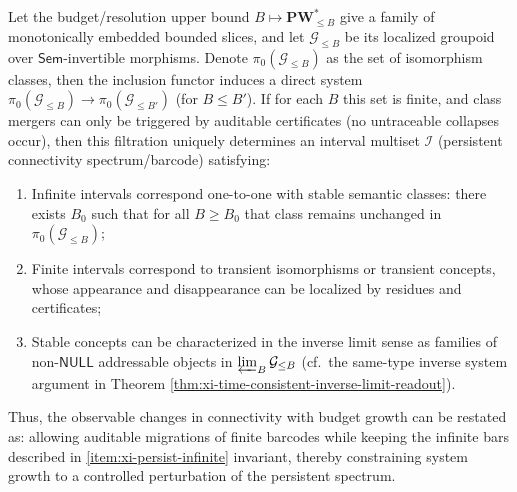 \begin{conclusion}\label{con:xi-connectivity-persistent-barcode}
Let the budget/resolution upper bound \(B\mapsto \mathbf{PW}^{\ast}_{\le B}\) give a family of monotonically embedded bounded slices, and let \(\mathcal{G}_{\le B}\) be its localized groupoid over \(\mathsf{Sem}\)-invertible morphisms.
Denote \(\pi_0(\mathcal{G}_{\le B})\) as the set of isomorphism classes, then the inclusion functor induces a direct system
\(
\pi_0(\mathcal{G}_{\le B})\to \pi_0(\mathcal{G}_{\le B'})
\)
(for \(B\le B'\)).
If for each \(B\) this set is finite, and class mergers can only be triggered by auditable certificates (no untraceable collapses occur), then this filtration uniquely determines an interval multiset \(\mathcal I\) (persistent connectivity spectrum/barcode) satisfying:
\begin{enumerate}
  \item Infinite intervals correspond one-to-one with stable semantic classes: there exists \(B_0\) such that for all \(B\ge B_0\) that class remains unchanged in \(\pi_0(\mathcal{G}_{\le B})\); \label{item:xi-persist-infinite}
  \item Finite intervals correspond to transient isomorphisms or transient concepts, whose appearance and disappearance can be localized by residues and certificates; \label{item:xi-persist-finite}
  \item Stable concepts can be characterized in the inverse limit sense as families of non-\(\mathsf{NULL}\) addressable objects in \(\varprojlim_B \mathcal{G}_{\le B}\) (cf.\ the same-type inverse system argument in Theorem \ref{thm:xi-time-consistent-inverse-limit-readout}). \label{item:xi-persist-invlim}
\end{enumerate}
Thus, the observable changes in connectivity with budget growth can be restated as: allowing auditable migrations of finite barcodes while keeping the infinite bars described in \ref{item:xi-persist-infinite} invariant, thereby constraining system growth to a controlled perturbation of the persistent spectrum.
\end{conclusion}

